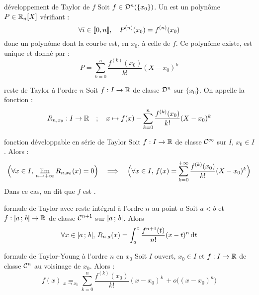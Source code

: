

\begin{adjustwidth}{-3cm}{-3cm}


\begin{definition}{25.13}{développement de Taylor de $f$}
Soit $f \in \mathcal{D}^{n}(\{x_0\})$. Un  est un polynôme $P \in \mathbb{R}_n[X]$ vérifiant :
$$ \forall i \in \llbracket 0,n \rrbracket, \quad P^{(n)}(x_0) = f^{(n)}(x_0) $$
donc un polynôme dont la courbe est, en $x_0$,  à celle de $f$. Ce polynôme existe, est unique et donné par : 
$$P = \sum_{k=0}^{n}\frac{f^{(k)}(x_0)}{k!}(X-x_0)^k$$
\end{definition}

\begin{definition}{25.16}{reste de Taylor à l'ordre $n$}
    Soit $f:I \to \mathbb{R}$ de classe $\mathcal{D}^{n}$ sur $\{x_0\}$. On appelle  la fonction : 
    $$R_{n,x_0} : I \to \mathbb{R} \quad ; \quad x \mapsto f(x) - \sum_{k=0}^{n}\frac{f^{(k)}(x_0)}{k!}(X-x_0)^k$$
\end{definition}

\begin{proposition}{25.18}{fonction développable en série de Taylor}
    Soit $f:I \to \mathbb{R}$ de classe $\mathcal{C}^{\infty}$ sur $I$, $x_0 \in I$. Alors : 
    $$\Bigr(\forall x \in I, \, \lim_{n \to +\infty} R_{n,x_0}(x) = 0\Bigl) \quad \implies \quad \Bigr(\forall x \in I, \, f(x) = \sum_{k=0}^{+\infty}\frac{f^{(k)}(x_0)}{k!}(X-x_0)^k\Bigl)$$
    Dans ce cas, on dit que $f$ est .
\end{proposition}

\begin{theoreme}{25.20}{formule de Taylor avec reste intégral à l'ordre $n$ au point $a$}
    Soit $a<b$ et $f:[a\, ; \, b] \to \mathbb{R}$ de classe $\mathcal{C}^{n+1}$ sur $[a\, ; \, b]$. Alors
    $$\forall x \in [a\, ; \, b],\, R_{n,a}(x) = \int_{a}^{x} \frac{f^{n+1}(t)}{n!}(x-t)^n\, \text{d}t $$

\end{theoreme}

\begin{theoreme}{25.27}{formule de Taylor-Young à l'ordre $n$ en $x_0$}
    Soit $I$ ouvert, $x_0 \in I$ et $f:I \to \mathbb{R}$ de classe $\mathcal{C}^{n}$ au voisinage de $x_0$. Alors : 
    $$f(x) \underset{x \to x_0}{=} \sum_{k=0}^{n}\frac{f^{(k)}(x_0)}{k!}(x-x_0)^k \, + o\bigl((x-x_0)^n\bigr)$$
\end{theoreme}


\end{adjustwidth}
